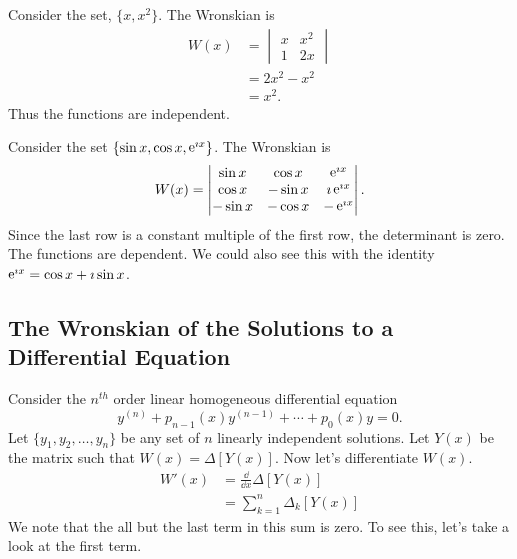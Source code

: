 \begin{Example}
  Consider the set, $\{x, x^2\}$.  The Wronskian is
  \begin{align*}
    W(x)    &=      \begin{vmatrix}
      x       &       x^2     \\
      1       &       2x
    \end{vmatrix} \\
    &= 2x^2 - x^2 \\
    &= x^2.
  \end{align*}
  Thus the functions are independent.
\end{Example}




\begin{Example}
  Consider the set $\{\sin x, \cos x, \mathop{\mathrm{e}}\nolimits^{\imath x} \}$.  The Wronskian is
  \[ W(x)    =      \begin{vmatrix}
    \sin x  &       \cos x  &       \mathop{\mathrm{e}}\nolimits^{\imath x}         \\
    \cos x  &       -\sin x &       \imath \mathop{\mathrm{e}}\nolimits^{\imath x}       \\
    -\sin x &       -\cos x &       -\mathop{\mathrm{e}}\nolimits^{\imath x}        
  \end{vmatrix}.\]
  Since the last row is a constant multiple of the first row, the determinant
  is zero.  The functions are dependent.  We could also see this with the
  identity $\mathop{\mathrm{e}}\nolimits^{\imath x} = \cos x + \imath \sin x$.
\end{Example}













\subsection{The Wronskian of the Solutions to a Differential Equation}
Consider the $n^{t h}$ order linear homogeneous differential equation
\[ y^{(n)} + p_{n-1}(x) y^{(n-1)} + \cdots + p_0(x) y = 0. \]
Let $\{y_1, y_2, \ldots, y_n\}$ be any set of $n$ linearly independent 
solutions.  
Let $Y(x)$ be the matrix such that $W(x) = \Delta[Y(x)]$.  Now let's 
differentiate $W(x)$.
\begin{align*}
  W'(x)   
  &= \frac{\dd}{\dd x} \Delta[Y(x)] \\
  &= \sum_{k=1}^n \Delta_k[Y(x)]
\end{align*}
We note that the all but the last term in this sum is zero.  To see this, 
let's take a look at the first term.

